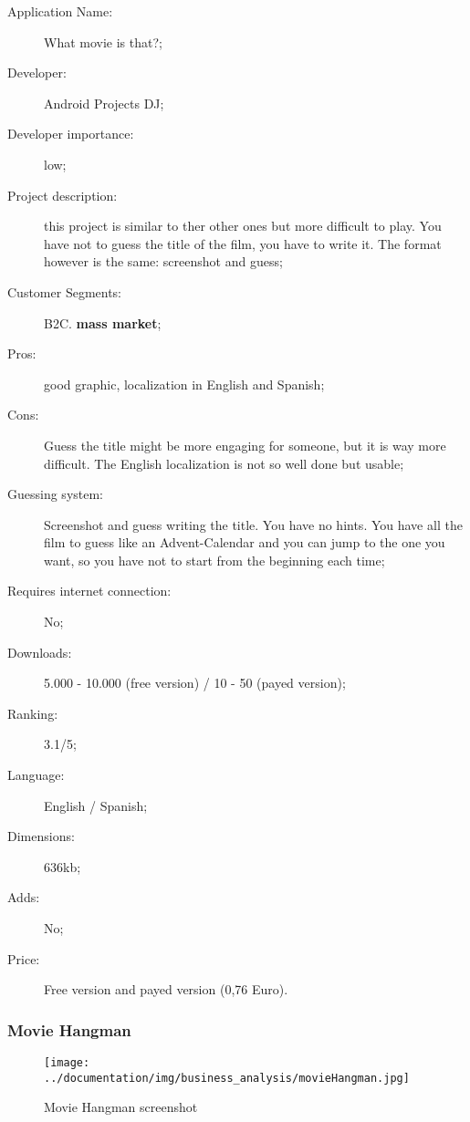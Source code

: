 \begin{description}
\item[Application Name:] What movie is that?;
\item[Developer:] Android Projects DJ;
\item[Developer importance:] low;
\item[Project description:] this project is similar to ther other ones but more difficult to play. You have not to guess the title of the film, you have to write it. The format however is the same: screenshot and guess;
\item[Customer Segments:] B2C. \textbf{mass market};
\item[Pros:] good graphic, localization in English and Spanish;
\item[Cons:] Guess the title might be more engaging for someone, but it is way more difficult. The English localization is not so well done but usable;
\item[Guessing system:] Screenshot and guess writing the title. You have no hints. You have all the film to guess like an Advent-Calendar and you can jump to the one you want, so you have not to start from the beginning each time;
\item[Requires internet connection:] No;
\item[Downloads:] 5.000 - 10.000 (free version) / 10 - 50 (payed version);
\item[Ranking:] 3.1/5;
\item[Language:] English / Spanish;
\item[Dimensions:] 636kb;
\item[Adds:] No;
\item[Price:] Free version and payed version (0,76 Euro).
\end{description}

\subsubsection{Movie Hangman}

\begin{figure}[H]
\centering %
\texttt{[image: ../documentation/img/business\_analysis/movieHangman.jpg]}
\caption{Movie Hangman screenshot}
\label{fig:movieHangman}
\end{figure}

